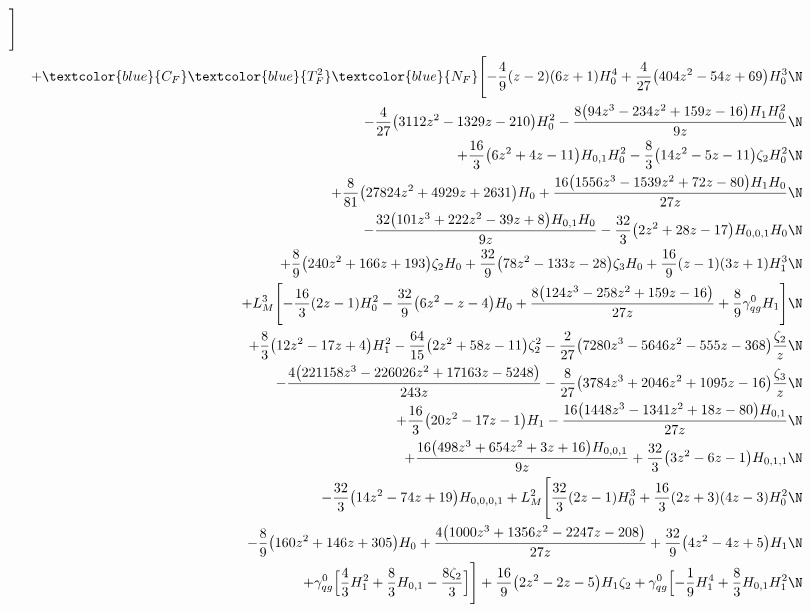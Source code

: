 \begin{eqnarray}
\Biggr]
\nonumber \\ &&
+\textcolor{blue}{C_F}  \textcolor{blue}{T_F^2} \textcolor{blue}{N_F}\Biggl[
-\frac{4}{9} (z-2) (6 z+1) H_0^4
+\frac{4}{27} \big(404 z^2-54 z+69\big) H_0^3
\N\\&&
-\frac{4}{27} \big(3112 z^2-1329 z-210\big) H_0^2
-\frac{8 \big(94 z^3-234 z^2+159 z-16\big) H_1 H_0^2}{9 z}
\N\\&&
+\frac{16}{3} \big(6 z^2+4 z-11\big) H_{0,1} H_0^2
-\frac{8}{3} \big(14 z^2-5 z-11\big) \zeta_2 H_0^2
\N\\&&
+\frac{8}{81} \big(27824 z^2+4929 z+2631\big) H_0
+\frac{16 \big(1556 z^3-1539 z^2+72 z-80\big) H_1 H_0}{27 z}
\N\\&&
-\frac{32 \big(101 z^3+222 z^2-39 z+8\big) H_{0,1} H_0}{9 z}
-\frac{32}{3} \big(2 z^2+28 z-17\big) H_{0,0,1} H_0
\N\\&&
+\frac{8}{9} \big(240 z^2+166 z+193\big) \zeta_2 H_0
+\frac{32}{9} \big(78 z^2-133 z-28\big) \zeta_3 H_0
+\frac{16}{9} (z-1) (3 z+1) H_1^3
\N\\&&
+ L_M^3 \Biggl[
-\frac{16}{3} (2 z-1) H_0^2
-\frac{32}{9} \big(6 z^2-z-4\big) H_0
+\frac{8 \big(124 z^3-258 z^2+159 z-16\big)}{27 z}
+\frac{8}{9} {\gamma}_{qg}^{0} H_1\Biggr]
\N\\&&
+\frac{8}{3} \big(12 z^2-17 z+4\big) H_1^2
-\frac{64}{15} \big(2 z^2+58 z-11\big) \zeta_2^2
-\frac{2}{27} \big(7280 z^3-5646 z^2-555 z-368\big) \frac{\zeta_2}{z}
\N\\&&
-\frac{4 \big(221158 z^3-226026 z^2+17163 z-5248\big)}{243 z}
-\frac{8}{27} \big(3784 z^3+2046 z^2+1095 z-16\big) \frac{\zeta_3}{z}
\N\\&&
+\frac{16}{3} \big(20 z^2-17 z-1\big) H_1
-\frac{16 \big(1448 z^3-1341 z^2+18 z-80\big) H_{0,1}}{27 z}
\N\\&&
+\frac{16 \big(498 z^3+654 z^2+3 z+16\big) H_{0,0,1}}{9 z}
+\frac{32}{3} \big(3 z^2-6 z-1\big) H_{0,1,1}
\N\\&&
-\frac{32}{3} \big(14 z^2-74 z+19\big) H_{0,0,0,1}
+L_M^2 \Biggl[
\frac{32}{3} (2 z-1) H_0^3
+\frac{16}{3} (2 z+3) (4 z-3) H_0^2
\N\\&&
-\frac{8}{9} \big(160 z^2+146 z+305\big) H_0
+\frac{4 \big(1000 z^3+1356 z^2-2247 z-208\big)}{27 z}
+\frac{32}{9} \big(4 z^2-4 z+5\big) H_1
\N\\&&
+{\gamma}_{qg}^{0} \Bigl[
\frac{4}{3} H_1^2
+\frac{8}{3} H_{0,1}
-\frac{8 \zeta_2}{3}\Bigr]\Biggr]
+\frac{16}{9} \big(2 z^2-2 z-5\big) H_1 \zeta_2
+{\gamma}_{qg}^{0} \Bigl[
-\frac{1}{9} H_1^4
+\frac{8}{3} H_{0,1} H_1^2
\N\\&&

\end{eqnarray}
